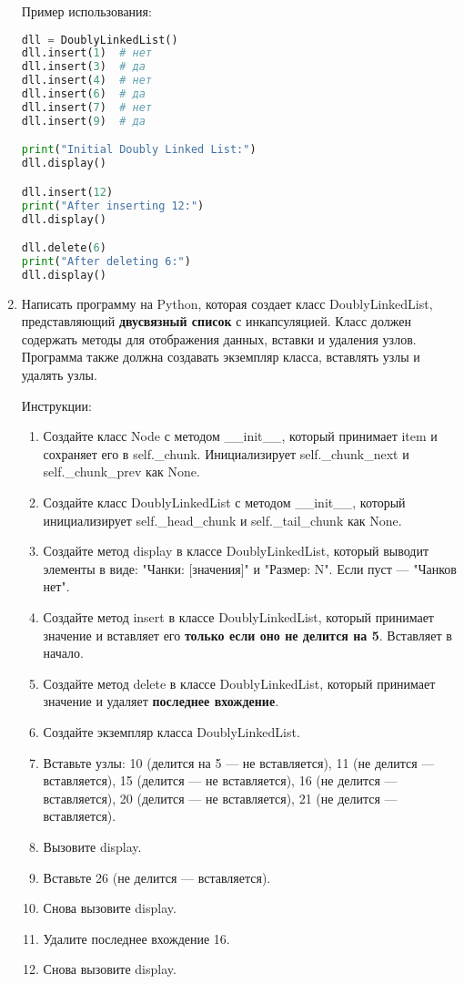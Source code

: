 \begin{enumerate}
Пример использования:
\begin{lstlisting}[language=Python]
dll = DoublyLinkedList()
dll.insert(1)  # нет
dll.insert(3)  # да
dll.insert(4)  # нет
dll.insert(6)  # да
dll.insert(7)  # нет
dll.insert(9)  # да

print("Initial Doubly Linked List:")
dll.display()

dll.insert(12)
print("After inserting 12:")
dll.display()

dll.delete(6)
print("After deleting 6:")
dll.display()
\end{lstlisting}

\item Написать программу на Python, которая создает класс DoublyLinkedList, представляющий \textbf{двусвязный список} с инкапсуляцией. Класс должен содержать методы для отображения данных, вставки и удаления узлов. Программа также должна создавать экземпляр класса, вставлять узлы и удалять узлы.

Инструкции:
\begin{enumerate}
    \item Создайте класс Node с методом \_\_init\_\_, который принимает item и сохраняет его в self.\_chunk. Инициализирует self.\_chunk\_next и self.\_chunk\_prev как None.
    \item Создайте класс DoublyLinkedList с методом \_\_init\_\_, который инициализирует self.\_head\_chunk и self.\_tail\_chunk как None.
    \item Создайте метод display в классе DoublyLinkedList, который выводит элементы в виде: "Чанки: [значения]" и "Размер: N". Если пуст — "Чанков нет".
    \item Создайте метод insert в классе DoublyLinkedList, который принимает значение и вставляет его \textbf{только если оно не делится на 5}. Вставляет в начало.
    \item Создайте метод delete в классе DoublyLinkedList, который принимает значение и удаляет \textbf{последнее вхождение}.
    \item Создайте экземпляр класса DoublyLinkedList.
    \item Вставьте узлы: 10 (делится на 5 — не вставляется), 11 (не делится — вставляется), 15 (делится — не вставляется), 16 (не делится — вставляется), 20 (делится — не вставляется), 21 (не делится — вставляется).
    \item Вызовите display.
    \item Вставьте 26 (не делится — вставляется).
    \item Снова вызовите display.
    \item Удалите последнее вхождение 16.
    \item Снова вызовите display.
\end{enumerate}


\end{enumerate}
